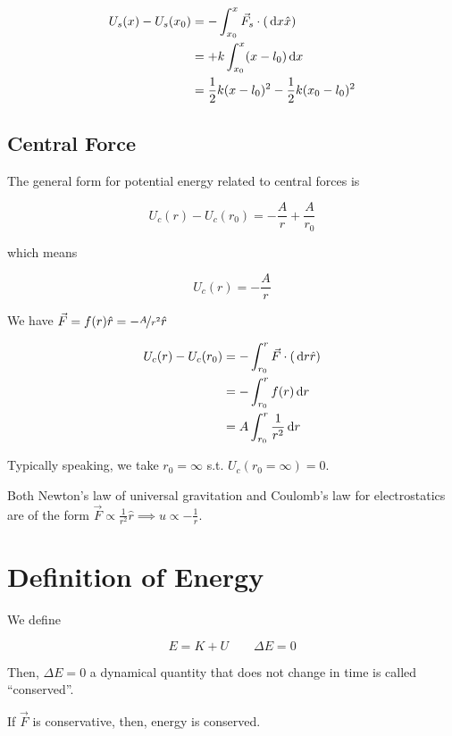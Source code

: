 \begin{align}
	U_s(x) - U_s(x_0) &= - \int_{x_0}^x \vec F_s \cdot (\D x \hat x)\\
	&= +k \int_{x_0}^x (x - l_0) \D x\\
	&= \frac{1}{2} k (x - l_0)^2 - \frac{1}{2} k (x_0 - l_0)^2
\end{align}

\subsection{Central Force}

\begin{definition}
	The general form for potential energy related to central forces is

	\begin{equation} U_c(r) - U_c(r_0) = -\frac{A}{r} + \frac{A}{r_0}
	\end{equation}

	which means

	\begin{equation}
		U_c(r) = - \frac{A}{r}
	\end{equation}
\end{definition}

We have $\vec F = f(r) \hat r = - \nicefrac{A}{r^2} \hat r$

\begin{align}
	U_c(r) - U_c(r_0) &= - \int_{r_0}^r \vec F \cdot \left(\D r \hat r\right)\\
	&= - \int_{r_0}^r f(r) \D r\\
	&= A \int_{r_0}^r \frac{1}{r^2} \D r
\end{align}

Typically speaking, we take $r_0 = \infty$ s.t. $U_c(r_0 = \infty) = 0$.

\begin{remark}
	Both Newton's law of universal gravitation and Coulomb's law for electrostatics are of the form $\vec F \propto \frac{1}{r^2} \hat r \implies u \propto - \frac{1}{r}$.
\end{remark}

\section{Definition of Energy}

\begin{definition}
	We define

	\begin{equation}
		E = K + U \qquad \Delta E = 0
	\end{equation}

	Then, $\Delta E = 0$ a dynamical quantity that does not change in time is called ``conserved''.

	If $\vec F$ is conservative, then, energy is conserved.
\end{definition}

